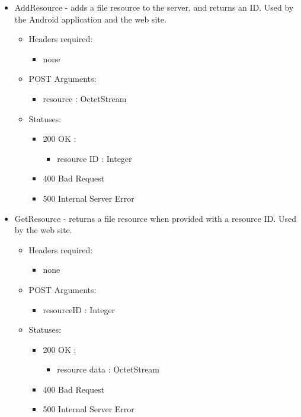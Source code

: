 \begin{itemize}
        \item AddResource - adds a file resource to the server, and returns an ID. Used by the Android application and the web site.
        \begin{itemize}
        \item Headers required: 
        \begin{itemize}
            \item none
        \end{itemize}
        \item POST Arguments:
        \begin{itemize}
        	\item resource : OctetStream
        \end{itemize}
        \item Statuses:
        \begin{itemize}
        	\item 200 OK :
            \begin{itemize}
        		\item resource ID : Integer
            \end{itemize}
        	\item 400 Bad Request
        	\item 500 Internal Server Error
        \end{itemize}
		\end{itemize}
	
        \item GetResource - returns a file resource when provided with a resource ID. Used by the web site.
        \begin{itemize}
        \item Headers required:
        \begin{itemize}
            \item none
        \end{itemize}
        \item POST Arguments:
        \begin{itemize}
        	\item resourceID : Integer
        \end{itemize}
        \item Statuses:
        \begin{itemize}
        	\item 200 OK : 
            \begin{itemize}
                \item resource data : OctetStream
            \end{itemize}
        	\item 400 Bad Request
        	\item 500 Internal Server Error
        \end{itemize}
	    \end{itemize}
	    

\end{itemize}
